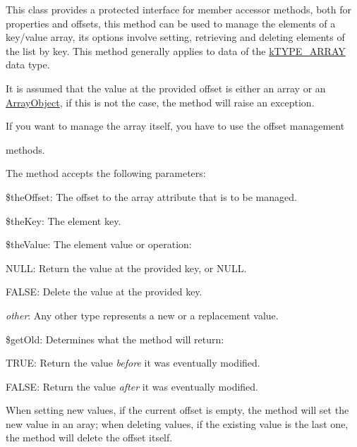 This class provides a protected interface for member accessor methods, both for properties and offsets, this method can be used to manage the elements of a key/value array, its options involve setting, retrieving and deleting elements of the list by key. This method generally applies to data of the \hyperlink{}{k\-T\-Y\-P\-E\-\_\-\-A\-R\-R\-A\-Y} data type.

It is assumed that the value at the provided offset is either an array or an \hyperlink{}{Array\-Object}, if this is not the case, the method will raise an exception.

If you want to manage the array itself, you have to use the offset management
\begin{DoxyItemize}
\item methods.

The method accepts the following parameters\-:


\begin{DoxyItemize}
\item {\ttfamily \$the\-Offset}\-: The offset to the array attribute that is to be managed. 
\item {\ttfamily \$the\-Key}\-: The element key. 
\item {\ttfamily \$the\-Value}\-: The element value or operation\-: 
\begin{DoxyItemize}
\item {\ttfamily N\-U\-L\-L}\-: Return the value at the provided key, or {\ttfamily N\-U\-L\-L}. 
\item {\ttfamily F\-A\-L\-S\-E}\-: Delete the value at the provided key. 
\item {\itshape other}\-: Any other type represents a new or a replacement value. 
\end{DoxyItemize}
\item {\ttfamily \$get\-Old}\-: Determines what the method will return\-: 
\begin{DoxyItemize}
\item {\ttfamily T\-R\-U\-E}\-: Return the value {\itshape before} it was eventually modified. 
\item {\ttfamily F\-A\-L\-S\-E}\-: Return the value {\itshape after} it was eventually modified. 
\end{DoxyItemize}
\end{DoxyItemize}

When setting new values, if the current offset is empty, the method will set the new value in an aray; when deleting values, if the existing value is the last one, the method will delete the offset itself.



\end{DoxyItemize}
